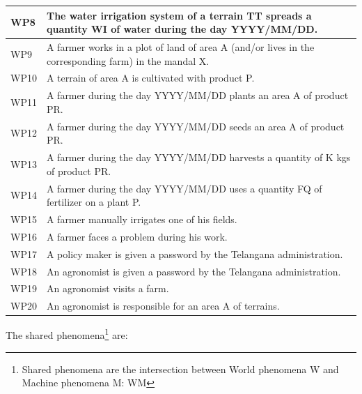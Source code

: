 \documentclass{article}
\begin{document}
\begin{longtable}[c]{|m{0.75cm}|m{11cm}|}
 WP8\label{WP8} & The water irrigation system  of a terrain TT spreads a quantity WI of water during the day YYYY/MM/DD.\\
 \hline
 WP9\label{WP9} & A farmer works in a plot of land of area A (and/or lives in the corresponding farm) in the mandal X.\\
 \hline
 WP10\label{WP10} & A terrain of area A is cultivated with product P.\\
 \hline
 WP11\label{WP11} & A farmer during the day YYYY/MM/DD plants an area A of product PR.\\
 \hline
  WP12\label{WP11} & A farmer during the day YYYY/MM/DD seeds an area A of product PR.\\
 \hline
 WP13\label{WP12} & A farmer during the day YYYY/MM/DD harvests a quantity of K kgs of product PR.\\
 \hline
 WP14\label{WP13} & A farmer during the day YYYY/MM/DD uses a quantity FQ of fertilizer on a plant P.\\
 \hline
 WP15\label{WP14} & A farmer manually irrigates one of his fields.\\
 \hline
 WP16\label{WP15} & A farmer faces a problem during his work.\\
 \hline
 WP17\label{WP18} & A policy maker is given a password by the Telangana administration.\\
 \hline
 
 WP18\label{WP20} & An agronomist is given a password by the Telangana administration.\\
 \hline
 WP19\label{WP21} & An agronomist visits a farm.\\
 \hline
  WP20\label{WP22} & An agronomist is responsible for an area A of terrains.\\
 \hline
 \end{longtable}
 \newpage
 The shared phenomena\footnote{Shared phenomena are the intersection between World phenomena W and Machine phenomena M: W\cap  M} are:
\end{document}
